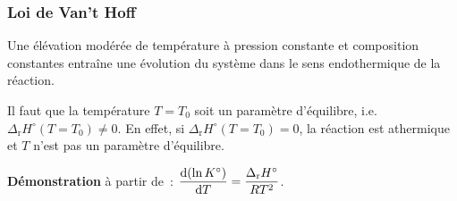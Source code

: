\documentclass{article}
\newcommand{\ds}{\displaystyle}
\newcommand{\Dr}{\Delta_{\mathrm{r}}}
\begin{document}
\subsubsection{Loi de Van't Hoff}
\begin{enonce}
    Une élévation modérée de température à pression constante et composition constantes entraîne une évolution du système dans le sens endothermique de la réaction.
\end{enonce}
\begin{tableau}
    \begin{attention}
        Il faut que la température $T=T_0$ soit un paramètre d'équilibre, i.e. $\Dr H^\circ(T=T_0) \neq 0$. En effet, si $\Dr H^\circ(T=T_0) = 0$, la réaction est athermique et $T$ n'est pas un paramètre d'équilibre.
    \end{attention}
    \textbf{Démonstration} à partir de~: $\ds\dv{(\ln K^\circ)}{T} = \frac{\Dr H^\circ}{RT^2}$.\\
    

\end{tableau}
\end{document}
